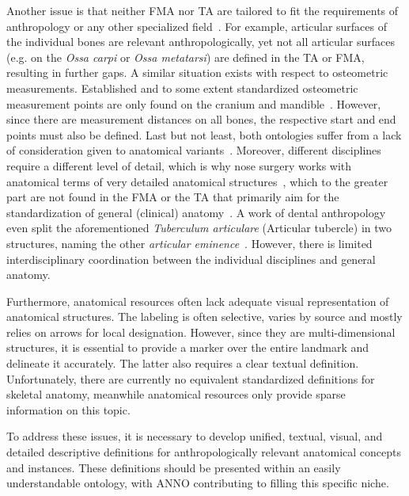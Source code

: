 \documentclass[sw]{iosart2x}
\newcommand{\latin}[1]{\emph{#1}}
\begin{document}
Another issue is that neither FMA nor TA are tailored to fit the requirements of anthropology or any other specialized field~\citep{fma}.
For example, articular surfaces of the individual bones are relevant anthropologically, yet not all articular surfaces (e.g. on the \latin{Ossa carpi} or \latin{Ossa metatarsi}) are defined in the TA or FMA, resulting in further gaps.
A similar situation exists with respect to osteometric measurements.
Established and to some extent standardized osteometric measurement points are only found on the cranium and mandible~\citep{wesenanthropologie}.
However, since there are measurement distances on all bones, the respective start and end points must also be defined.
Last but not least, both ontologies suffer from a lack of consideration given to anatomical variants~\citep{anatomycontribution}.
Moreover, different disciplines require a different level of detail, which is why nose surgery works with anatomical terms of very detailed anatomical structures~\citep{graysanatomy},
which to the greater part are not found in the FMA or the TA that primarily aim for the standardization of general (clinical) anatomy~\citep{fma}.
A work of dental anthropology even split the aforementioned \latin{Tuberculum articulare} (Articular tubercle) in two structures,
naming the other \emph{articular eminence}~\citep{dentalanthropology}.
However, there is limited interdisciplinary coordination between the individual disciplines and general anatomy.

Furthermore, anatomical resources often lack adequate visual representation of anatomical structures.
The labeling is often selective, varies by source and mostly relies on arrows for local designation.
However, since they are multi-dimensional structures, it is essential to provide a marker over the entire landmark and delineate it accurately.
The latter also requires a clear textual definition.
Unfortunately, there are currently no equivalent standardized definitions for skeletal anatomy, meanwhile anatomical resources only provide sparse information on this topic.

To address these issues, it is necessary to develop unified, textual, visual, and detailed descriptive definitions for anthropologically relevant anatomical concepts and instances.
These definitions should be presented within an easily understandable ontology, with ANNO contributing to filling this specific niche.
\end{document}
